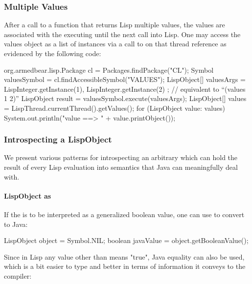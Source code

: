 \documentclass[10pt]{book}
\begin{document}
\subsubsection{Multiple Values}

After a call to a function that returns Lisp multiple values, the
values are associated with the executing  until the
next call into Lisp.  One may access the values object as a list of
 instances via a call to  on that
thread reference
as evidenced by the following code:

\begin{listing-java}

  org.armedbear.lisp.Package cl = Packages.findPackage("CL");
  Symbol valuesSymbol = cl.findAccessibleSymbol("VALUES");
  LispObject[] valuesArgs = {
    LispInteger.getInstance(1), LispInteger.getInstance(2)
  };
  // equivalent to ``(values 1 2)''
  LispObject result = valuesSymbol.execute(valuesArgs); 
  LispObject[] values = LispThread.currentThread().getValues();
  for (LispObject value: values) {
    System.out.println("value ==> " + value.printObject());
  }
\end{listing-java}

\subsubsection{Introspecting a LispObject}
\label{topic:Introspecting a LispObject}

We present various patterns for introspecting an arbitrary
 which can hold the result of every Lisp evaluation
into semantics that Java can meaningfully deal with.

\paragraph{LispObject as }

If the  is to be interpreted as a generalized boolean
value, one can use  to convert to Java:

\begin{listing-java}
   LispObject object = Symbol.NIL;
   boolean javaValue = object.getBooleanValue();
\end{listing-java}

Since in Lisp any value other than  means "true", Java
equality can also be used, which is a bit easier to type and better in
terms of information it conveys to the compiler:
\end{document}
